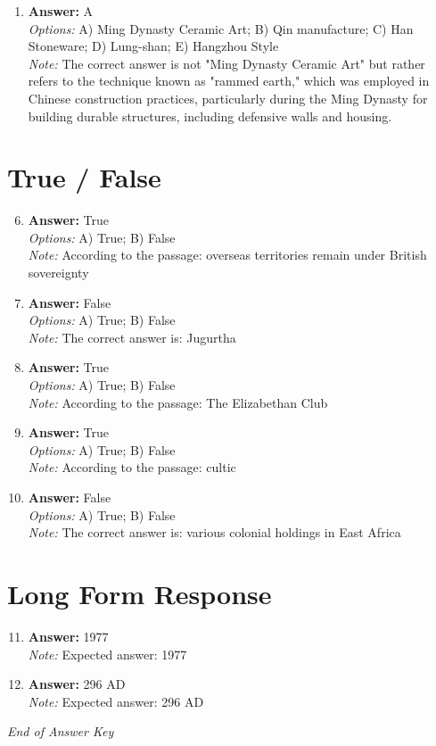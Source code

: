 \documentclass[12pt]{article}
\begin{document}
\begin{enumerate}[label=\arabic*.]
\\ \textit{Note:} Scapulimancy refers specifically to the practice of divining the future by examining the shoulder blades of animals, particularly in ancient Chinese culture, making it the accurate term for this historical practice.
\item \textbf{Answer:} A
\\ \textit{Options:} A) Ming Dynasty Ceramic Art; B) Qin manufacture; C) Han Stoneware; D) Lung-shan; E) Hangzhou Style
\\ \textit{Note:} The correct answer is not "Ming Dynasty Ceramic Art" but rather refers to the technique known as "rammed earth," which was employed in Chinese construction practices, particularly during the Ming Dynasty for building durable structures, including defensive walls and housing.
\end{enumerate}

\section*{True / False}
\begin{enumerate}[label=\arabic*.]
\setcounter{enumi}{5}
\item \textbf{Answer:} True
\\ \textit{Options:} A) True; B) False
\\ \textit{Note:} According to the passage: overseas territories remain under British sovereignty
\item \textbf{Answer:} False
\\ \textit{Options:} A) True; B) False
\\ \textit{Note:} The correct answer is: Jugurtha
\item \textbf{Answer:} True
\\ \textit{Options:} A) True; B) False
\\ \textit{Note:} According to the passage: The Elizabethan Club
\item \textbf{Answer:} True
\\ \textit{Options:} A) True; B) False
\\ \textit{Note:} According to the passage: cultic
\item \textbf{Answer:} False
\\ \textit{Options:} A) True; B) False
\\ \textit{Note:} The correct answer is: various colonial holdings in East Africa
\end{enumerate}

\section*{Long Form Response}
\begin{enumerate}[label=\arabic*.]
\setcounter{enumi}{10}
\item \textbf{Answer:} 1977
\\ \textit{Note:} Expected answer: 1977
\item \textbf{Answer:} 296 AD
\\ \textit{Note:} Expected answer: 296 AD
\end{enumerate}

\vfill
\noindent\textit{End of Answer Key}
\end{document}
